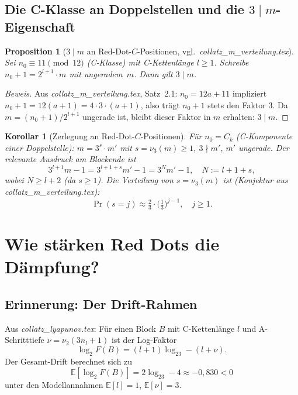 \documentclass[12pt,a4paper]{article}
\newtheorem{proposition}[definition]{Proposition}
\newtheorem{korollar}[definition]{Korollar}
\newenvironment{beweis}{\begin{proof}[Beweis]}{\end{proof}}
\newcommand{\vii}{\nu_2}
\newcommand{\viii}{\nu_3}
\newcommand{\E}{\mathbb{E}}
\newcommand{\logt}{\log_2}
\begin{document}
\subsection{Die C-Klasse an Doppelstellen und die \texorpdfstring{$3 \mid m$}{3|m}-Eigenschaft}

\begin{proposition}[$3 \mid m$ an Red-Dot-$C$-Positionen, vgl.\ \textit{collatz\_m\_verteilung.tex}]
\label{prop:drei_teilt_m}
Sei $n_0 \equiv 11 \pmod{12}$ (C-Klasse) mit C-Kettenlänge $l \geq 1$.
Schreibe $n_0 + 1 = 2^{l+1} \cdot m$ mit ungeradem~$m$.
Dann gilt $3 \mid m$.
\end{proposition}

\begin{beweis}
Aus \textit{collatz\_m\_verteilung.tex}, Satz~2.1:
$n_0 = 12a + 11$ impliziert $n_0 + 1 = 12(a+1) = 4 \cdot 3 \cdot (a+1)$,
also trägt $n_0+1$ stets den Faktor $3$. Da $m = (n_0+1)/2^{l+1}$ ungerade ist,
bleibt dieser Faktor in $m$ erhalten: $3 \mid m$.
\end{beweis}

\begin{korollar}[Zerlegung an Red-Dot-$C$-Positionen]
\label{kor:zerlegung}
Für $n_0 = C_k$ (C-Komponente einer Doppelstelle):
$m = 3^s \cdot m'$ mit $s = \viii(m) \geq 1$, $3 \nmid m'$, $m'$ ungerade.
Der relevante Ausdruck am Blockende ist
\[
  3^{l+1} m - 1 = 3^{l+1+s} m' - 1 = 3^N m' - 1,
  \quad N := l + 1 + s,
\]
wobei $N \geq l + 2$ (da $s \geq 1$).
Die Verteilung von $s = \viii(m)$ ist (Konjektur aus \textit{collatz\_m\_verteilung.tex}):
\[
  \Pr(s = j) \approx \tfrac{2}{3} \cdot \bigl(\tfrac{1}{3}\bigr)^{j-1}, \quad j \geq 1.
\]
\end{korollar}

\section{Wie stärken Red Dots die Dämpfung?}
\label{sec:daempfung}

\subsection{Erinnerung: Der Drift-Rahmen}

Aus \textit{collatz\_lyapunov.tex}: Für einen Block $B$ mit C-Kettenlänge $l$
und A-Schritttiefe $\nu = \vii(3n_l + 1)$ ist der Log-Faktor
\[
  \logt F(B) = (l+1)\logt 3 - (l + \nu).
\]
Der Gesamt-Drift berechnet sich zu
\[
  \E[\logt F(B)] = 2\logt 3 - 4 \approx -0{,}830 < 0
\]
unter den Modellannahmen $\E[l]=1$, $\E[\nu]=3$.
\end{document}
